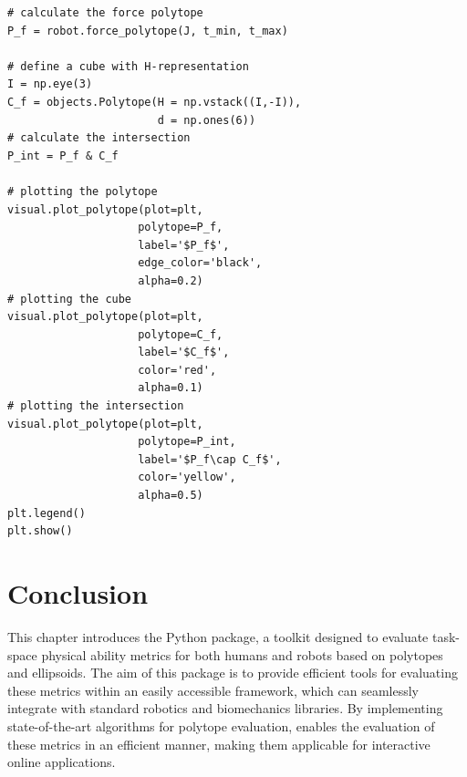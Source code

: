 {\begin{verbatim}
# calculate the force polytope
P_f = robot.force_polytope(J, t_min, t_max) 

# define a cube with H-representation
I = np.eye(3)
C_f = objects.Polytope(H = np.vstack((I,-I)), 
                       d = np.ones(6))  
# calculate the intersection
P_int = P_f & C_f
                    
# plotting the polytope
visual.plot_polytope(plot=plt, 
                    polytope=P_f, 
                    label='$P_f$',
                    edge_color='black',
                    alpha=0.2)
# plotting the cube
visual.plot_polytope(plot=plt, 
                    polytope=C_f,  
                    label='$C_f$',
                    color='red',
                    alpha=0.1)
# plotting the intersection
visual.plot_polytope(plot=plt, 
                    polytope=P_int, 
                    label='$P_f\cap C_f$',
                    color='yellow',
                    alpha=0.5)
plt.legend()
plt.show()
\end{verbatim}
}


\section{Conclusion}

This chapter introduces the  Python package, a toolkit designed to evaluate task-space physical ability metrics for both humans and robots based on polytopes and ellipsoids. The aim of this package is to provide efficient tools for evaluating these metrics within an easily accessible framework, which can seamlessly integrate with standard robotics and biomechanics libraries. By implementing state-of-the-art algorithms for polytope evaluation,  enables the evaluation of these metrics in an efficient manner, making them applicable for interactive online applications.